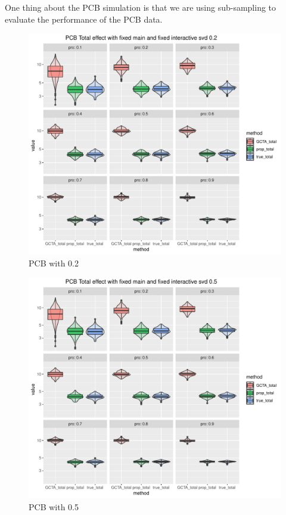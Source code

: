 \documentclass[]{article}
\begin{document}
One thing about the PCB simulation is that we are using sub-sampling to
evaluate the performance of the PCB data.

\begin{figure}
\centering
\includegraphics{./generate_graph_as_pdf/plot_PCB_fixed_fixed_pro_0.1_0.9_p_33_svd_0.2.pdf}
\caption{PCB with 0.2}
\end{figure}

\begin{figure}
\centering
\includegraphics{./generate_graph_as_pdf/plot_PCB_fixed_fixed_pro_0.1_0.9_p_33_svd_0.5.pdf}
\caption{PCB with 0.5}
\end{figure}
\end{document}
